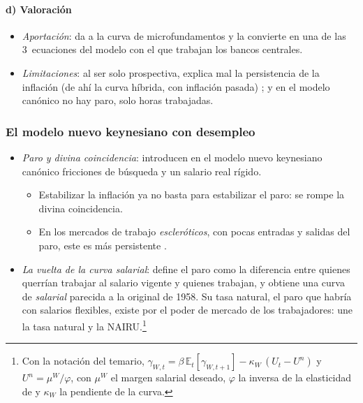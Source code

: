 \documentclass[11pt]{article}
\begin{document}
\paragraph{d) Valoración}

\begin{itemize}
\item \emph{Aportación}: da a la curva de  microfundamentos y la convierte en una de las 3~ecuaciones del modelo con el que trabajan los bancos centrales.
\item \emph{Limitaciones}: al ser solo prospectiva, explica mal la persistencia de la inflación (de ahí la curva híbrida, con inflación pasada) ; y en el modelo canónico no hay paro, solo horas trabajadas.
\end{itemize}

\subsubsection{El modelo nuevo keynesiano con desempleo}\label{sec:nek-desempleo}

\begin{itemize}
\item \emph{Paro y divina coincidencia}: \textcite{BlanchardGali2010Labor} introducen en el modelo nuevo keynesiano canónico fricciones de búsqueda y un salario real rígido.
  \begin{itemize}
  \item Estabilizar la inflación ya no basta para estabilizar el paro: se rompe la divina coincidencia.
  \item En los mercados de trabajo \emph{escleróticos}, con pocas entradas y salidas del paro, este es más persistente .
  \end{itemize}
\item \emph{La vuelta de la curva salarial}: \textcite{Gali2011Return} define el paro como la diferencia entre quienes querrían trabajar al salario vigente y quienes trabajan, y obtiene una curva de  \emph{salarial} parecida a la original de 1958. Su tasa natural, el paro que habría con salarios flexibles, existe por el poder de mercado de los trabajadores: une la tasa natural y la NAIRU.\footnote{Con la notación del temario, $\gamma_{W,t}=\beta\,\mathbb{E}_t[\gamma_{W,t+1}]-\kappa_W\,(U_t-U^n)$ y $U^n=\mu^W/\varphi$, con $\mu^W$ el margen salarial deseado, $\varphi$ la inversa de la elasticidad de  y $\kappa_W$ la pendiente de la curva\nocite{Gali2011Return}.}
\end{itemize}
\end{document}
